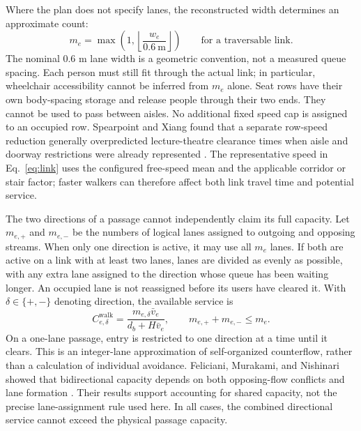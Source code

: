 \documentclass[11pt,a4paper]{article}
\begin{document}
Where the plan does not specify lanes, the reconstructed width determines an approximate count:
\begin{equation}\label{eq:lanes}
m_e=\max\!\left(1,\left\lfloor \frac{w_e}{0.6\ \mathrm{m}}\right\rfloor\right)
\qquad\text{for a traversable link}.
\end{equation}
The nominal $0.6$ m lane width is a geometric convention, not a measured queue spacing. Each person must still fit through the actual link; in particular, wheelchair accessibility cannot be inferred from $m_e$ alone. Seat rows have their own body-spacing storage and release people through their two ends. They cannot be used to pass between aisles. No additional fixed speed cap is assigned to an occupied row. Spearpoint and Xiang found that a separate row-speed reduction generally overpredicted lecture-theatre clearance times when aisle and doorway restrictions were already represented \cite{spearpoint}. The representative speed in Eq.~\eqref{eq:link} uses the configured free-speed mean and the applicable corridor or stair factor; faster walkers can therefore affect both link travel time and potential service.

The two directions of a passage cannot independently claim its full capacity. Let $m_{e,+}$ and $m_{e,-}$ be the numbers of logical lanes assigned to outgoing and opposing streams. When only one direction is active, it may use all $m_e$ lanes. If both are active on a link with at least two lanes, lanes are divided as evenly as possible, with any extra lane assigned to the direction whose queue has been waiting longer. An occupied lane is not reassigned before its users have cleared it. With $\delta\in\{+,-\}$ denoting direction, the available service is
\begin{equation}\label{eq:direction}
C_{e,\delta}^{\mathrm{walk}}=
\frac{m_{e,\delta}\bar v_e}{d_b+H\bar v_e},
\qquad m_{e,+}+m_{e,-}\leq m_e.
\end{equation}
On a one-lane passage, entry is restricted to one direction at a time until it clears. This is an integer-lane approximation of self-organized counterflow, rather than a calculation of individual avoidance. Feliciani, Murakami, and Nishinari showed that bidirectional capacity depends on both opposing-flow conflicts and lane formation \cite{feliciani2018}. Their results support accounting for shared capacity, not the precise lane-assignment rule used here. In all cases, the combined directional service cannot exceed the physical passage capacity.
\end{document}
